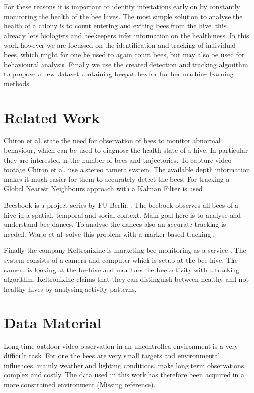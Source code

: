 \documentclass[10pt,a4paper]{article}
\begin{document}
For these reasons it is important to identify infestations early on by constantly monitoring the health of the bee hives. The most simple solution to analyse the health of a colony is to count entering and exiting bees from the hive, this already lets biologists and beekeepers infer information on the healthiness. In this work however we are focussed on the identification and tracking of individual bees, which might for one be used to again count bees, but may also be used for behavioural analysis. Finally we use the created detection and tracking algorithm to propose a new dataset containing beepatches for further machine learning methods.

\section{Related Work}

Chiron et al. state the need for observation of bees to monitor abnormal behaviour, which can be used to diagnose the health state of a hive. In particular they are interested in the number of bees and trajectories. To capture video footage Chiron et al. use a stereo camera system. The available depth information makes it much easier for them to accurately detect the bees. For tracking a Global Nearest Neighbours approach with a Kalman Filter is used \cite{chiron2013detecting}.

Beesbook is a project series by FU Berlin \cite{beesbook}. The beebook observes all bees of a hive in a spatial, temporal and social context. Main goal here is to analyse and understand bee dances. To analyse the dances also an accurate tracking is needed. Wario et al. solve this problem with a marker based tracking \cite{wario2015automatic}. 

Finally the company Keltronixinc is marketing bee monitoring as a service \cite{keltronixinc}. The system consists of a camera and computer which is setup at the bee hive. The camera is looking at the beehive and monitors the bee activity with a tracking algorithm. Keltronixinc claims that they can distinguish between healthy and not healthy hives by analysing activity patterns.

\section{Data Material}
\label{sec:data}

Long-time outdoor video observation in an uncontrolled environment is a very difficult task. For one the bees are very small targets and environmental influences, mainly weather and lighting conditions, make long term observations complex and costly. The data used in this work has therefore been acquired in a more constrained environment (Missing reference).
\end{document}
